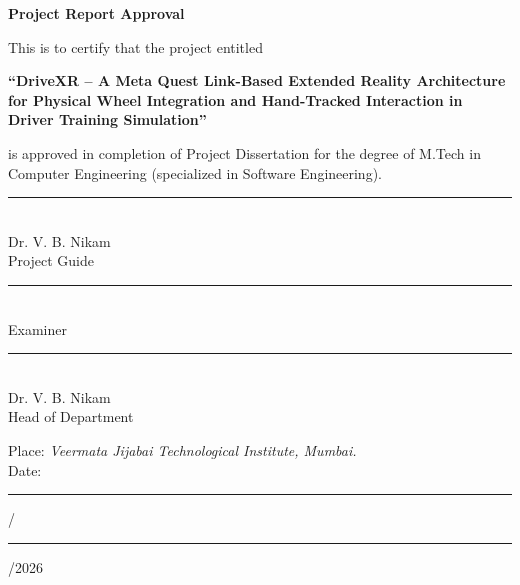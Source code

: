 \clearpage
\thispagestyle{empty}

\begin{center}
\vspace*{1cm}
{\LARGE \textbf{Project Report Approval}}
\end{center}

\vspace{1.2cm}

\begin{center}
\begin{minipage}{0.82\textwidth}
\centering
\large
This is to certify that the project entitled

\vspace{0.4cm}

\textbf{``DriveXR -- A Meta Quest Link-Based Extended Reality Architecture for Physical Wheel Integration and Hand-Tracked Interaction in Driver Training Simulation''}

\vspace{0.4cm}

is approved in completion of Project Dissertation for the degree of
M.Tech in Computer Engineering (specialized in Software Engineering).
\end{minipage}
\end{center}

\vspace{2.2cm}

\noindent
\begin{minipage}[t]{0.45\textwidth}
\centering
\rule{0.8\linewidth}{0.4pt}\\[0.3cm]
{\large Dr. V. B. Nikam}\\[0.15cm]
Project Guide
\end{minipage}
\hfill
\begin{minipage}[t]{0.45\textwidth}
\centering
\rule{0.8\linewidth}{0.4pt}\\[0.3cm]
{\large Examiner}
\end{minipage}

\vspace{2.2cm}

\begin{center}
\begin{minipage}[t]{0.45\textwidth}
\centering
\rule{0.8\linewidth}{0.4pt}\\[0.3cm]
{\large Dr. V. B. Nikam}\\[0.15cm]
Head of Department
\end{minipage}
\end{center}

\vfill

\noindent Place: \textit{Veermata Jijabai Technological Institute, Mumbai.}\\[0.3cm]
Date: \rule{0.8cm}{0.4pt}/\rule{0.8cm}{0.4pt}/2026

\clearpage